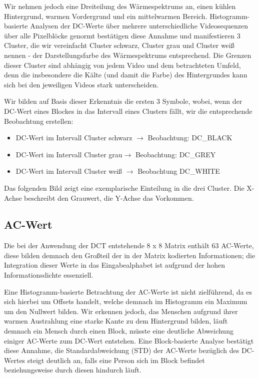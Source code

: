 Wir nehmen jedoch eine Dreiteilung des Wärmespektrums an, einen kühlen Hintergrund, warmen Vordergrund und ein mittelwarmen Bereich.
 Histogramm-basierte Analysen der DC-Werte über mehrere unterschiedliche Videosequenzen über alle Pixelblöcke genormt bestätigen diese Annahme und manifestieren 3 Cluster, die wir vereinfacht Cluster schwarz, Cluster grau und Cluster weiß nennen - der Darstellungsfarbe des Wärmespektrums entsprechend.
 Die Grenzen dieser Cluster sind abhängig von jedem Video und dem betrachteten Umfeld, denn die insbesondere die Kälte (und damit die Farbe) des Hintergrundes kann sich bei den jeweiligen Videos stark unterscheiden.


Wir bilden auf Basis dieser Erkenntnis die ersten 3 Symbole, wobei, wenn der DC-Wert eines Blockes in das Intervall eines Clusters fällt, wir die entsprechende Beobachtung erstellen:

\begin{itemize}
	\item DC-Wert im Intervall Cluster schwarz $\rightarrow$ Beobachtung: DC\_BLACK
	\item DC-Wert im Intervall Cluster grau$\rightarrow$ Beobachtung: DC\_GREY
	\item DC-Wert im Intervall Cluster weiß $\rightarrow$ Beobachtung DC\_WHITE
\end{itemize}

Das folgenden Bild zeigt eine exemplarische Einteilung in die drei Cluster.
 Die X-Achse beschreibt den Grauwert, die Y-Achse das Vorkommen.

\subsection{AC-Wert}

Die bei der Anwendung der DCT entstehende 8 x 8 Matrix enthält 63 AC-Werte, diese bilden demnach den Großteil der in der Matrix kodierten Informationen; die Integration dieser Werte in das Eingabealphabet ist aufgrund der hohen Informationsdichte essenziell.
 

Eine Histogramm-basierte Betrachtung der AC-Werte ist nicht zielführend, da es sich hierbei um Offsets handelt, welche demnach im Histogramm ein Maximum um den Nullwert bilden.
 Wir erkennen jedoch, das Menschen aufgrund ihrer warmen Austrahlung eine starke Kante zu dem Hintergrund bilden, läuft demnach ein Mensch durch einen Block, müsste eine deutliche Abweichung einiger AC-Werte zum DC-Wert entstehen.
 Eine Block-basierte Analyse bestätigt diese Annahme, die Standardabweichung (STD) der AC-Werte bezüglich des DC-Wertes steigt deutlich an, falls eine Person sich im Block befindet beziehungsweise durch diesen hindurch läuft.
 

